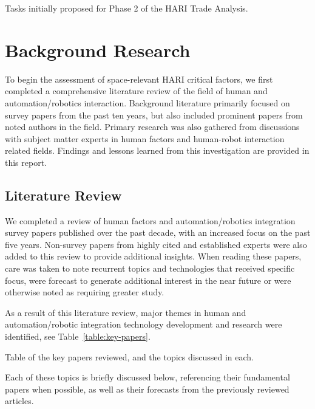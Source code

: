 \begin{table}[tbp]
    \centering
    \caption[Tasks initially proposed for Phase 2 of the HARI Trade Analysis]{Tasks initially proposed for Phase 2 of the HARI Trade Analysis.}
    \label{table:phase2}
\end{table}

\section{Background Research}
To begin the assessment of space-relevant HARI critical factors, we first completed a comprehensive literature review of the field of human and automation/robotics interaction.
Background literature primarily focused on survey papers from the past ten years, but also included prominent papers from noted authors in the field.
Primary research was also gathered from discussions with subject matter experts in human factors and human-robot interaction related fields.
Findings and lessons learned from this investigation are provided in this report.

\subsection{Literature Review}
We completed a review of human factors and automation/robotics integration survey papers published over the past decade, with an increased focus on the past five years.
Non-survey papers from highly cited and established experts were also added to this review to provide additional insights.
When reading these papers, care was taken to note recurrent topics and technologies that received specific focus, were forecast to generate additional interest in the near future or were otherwise noted as requiring greater study.

As a result of this literature review, major themes in human and automation/robotic integration technology development and research were identified, see Table~\ref{table:key-papers}.

\begin{table}[tbp]
    \centering
    \caption[Table of the key papers reviewed]{Table of the key papers reviewed, and the topics discussed in each.}
    \label{table:key-papers}
\end{table}

Each of these topics is briefly discussed below, referencing their fundamental papers when possible, as well as their forecasts from the previously reviewed articles.

